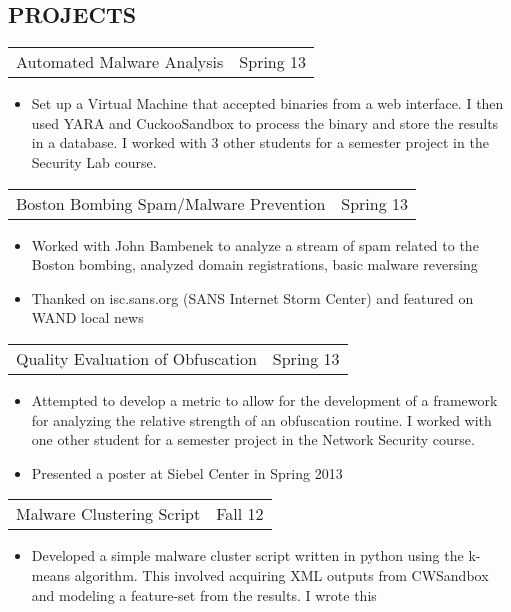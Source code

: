 \documentclass[margin]{res}
\begin{document}
\begin{resume}
\section{PROJECTS}
\begin{tabular}{p{3in} r} %
Automated Malware Analysis & Spring 13
\end{tabular}
\begin{itemize} \itemsep -2pt
\item Set up a Virtual Machine that accepted binaries from a web
  interface.  I then used YARA and CuckooSandbox to process the binary
  and store the results in a database.  I worked with 3 other
  students for a semester project in the Security Lab course.
\end{itemize}
\begin{tabular}{p{3in} r} %
Boston Bombing Spam/Malware Prevention & Spring 13
\end{tabular}
\begin{itemize} \itemsep -2pt
\item Worked with John Bambenek to analyze a stream of spam related
  to the Boston bombing, analyzed domain registrations, basic malware
  reversing
\item Thanked on isc.sans.org (SANS Internet Storm Center) and featured on WAND local news
\end{itemize}
\begin{tabular}{p{3in} r} %
Quality Evaluation of Obfuscation & Spring 13
\end{tabular}
\begin{itemize} \itemsep -2pt
\item Attempted to develop a metric to allow for the development of
  a framework for analyzing the relative strength of an obfuscation
  routine.  I worked with one other student for a semester project in
  the Network Security course.
\item Presented a poster at Siebel Center in Spring 2013
\end{itemize}
\begin{tabular}{p{3in} r} %
Malware Clustering Script & Fall 12
\end{tabular}
\begin{itemize} \itemsep -2pt
\item Developed a simple malware cluster script written in python using the
  k-means algorithm.  This involved acquiring XML outputs from
  CWSandbox and modeling a feature-set from the results.  I wrote this

\end{itemize}
\end{resume}
\end{document}
